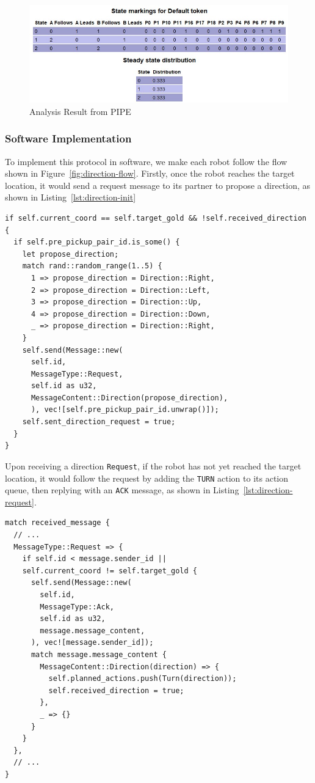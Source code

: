 \documentclass[12pt,a4paper]{article}
\begin{document}
\begin{figure}
    \centering
    \includegraphics[width=\linewidth]{images/pipe_analysis.jpg}
    \caption{Analysis Result from PIPE}   
    \label{fig:pipe-analysis}
\end{figure}

\subsubsection{Software Implementation}
To implement this protocol in software, we make each robot follow the flow shown in Figure~\ref{fig:direction-flow}. Firstly, once the robot reaches the target location, it would send a request message to its partner to propose a direction, as shown in Listing~\ref{lst:direction-init}

\begin{lstlisting}[float, caption={Robot Sends Direction \texttt{Request}}, label={lst:direction-init}]
if self.current_coord == self.target_gold && !self.received_direction {
  if self.pre_pickup_pair_id.is_some() {
    let propose_direction;
    match rand::random_range(1..5) {
      1 => propose_direction = Direction::Right,
      2 => propose_direction = Direction::Left,
      3 => propose_direction = Direction::Up,
      4 => propose_direction = Direction::Down,
      _ => propose_direction = Direction::Right,
    }
    self.send(Message::new(
      self.id,
      MessageType::Request,
      self.id as u32,
      MessageContent::Direction(propose_direction),
      ), vec![self.pre_pickup_pair_id.unwrap()]);
    self.sent_direction_request = true;
  }
}
\end{lstlisting}

Upon receiving a direction \texttt{Request}, if the robot has not yet reached the target location, it would follow the request by adding the \texttt{TURN} action to its action queue, then replying with an \texttt{ACK} message, as shown in Listing~\ref{lst:direction-request}.

\begin{lstlisting}[float, caption={Robot Receives Direction \texttt{Request}}, label={lst:direction-request}]
match received_message {
  // ...
  MessageType::Request => {
    if self.id < message.sender_id || 
    self.current_coord != self.target_gold {
      self.send(Message::new(
        self.id,
        MessageType::Ack,
        self.id as u32,
        message.message_content,
      ), vec![message.sender_id]);
      match message.message_content {
        MessageContent::Direction(direction) => {
          self.planned_actions.push(Turn(direction));
          self.received_direction = true;
        },
        _ => {}
      }
    }
  },
  // ...
}
\end{lstlisting}
\end{document}

